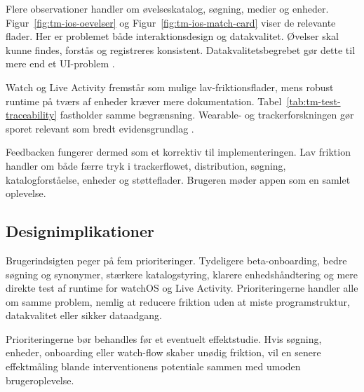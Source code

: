 Flere observationer handler om øvelseskatalog, søgning, medier og enheder. Figur~\ref{fig:tm-ios-oevelser} og Figur~\ref{fig:tm-ios-match-card} viser de relevante flader. Her er problemet både interaktionsdesign og datakvalitet. Øvelser skal kunne findes, forstås og registreres konsistent. Datakvalitetsbegrebet gør dette til mere end et UI-problem \cite{mohammed2025_five_facets_data_quality}.

Watch og Live Activity fremstår som mulige lav-friktionsflader, mens robust runtime på tværs af enheder kræver mere dokumentation. Tabel~\ref{tab:tm-test-traceability} fastholder samme begrænsning. Wearable- og trackerforskningen gør sporet relevant som bredt evidensgrundlag \cite{brickwood2019_wearable_trackers_meta,laranjo2021_apps_trackers_meta}.

Feedbacken fungerer dermed som et korrektiv til implementeringen. Lav friktion handler om både færre tryk i trackerflowet, distribution, søgning, katalogforståelse, enheder og støtteflader. Brugeren møder appen som en samlet oplevelse.

\subsection{Designimplikationer}

Brugerindsigten peger på fem prioriteringer. Tydeligere beta-onboarding, bedre søgning og synonymer, stærkere katalogstyring, klarere enhedshåndtering og mere direkte test af runtime for watchOS og Live Activity. Prioriteringerne handler alle om samme problem, nemlig at reducere friktion uden at miste programstruktur, datakvalitet eller sikker dataadgang.

Prioriteringerne bør behandles før et eventuelt effektstudie. Hvis søgning, enheder, onboarding eller watch-flow skaber unødig friktion, vil en senere effektmåling blande interventionens potentiale sammen med umoden brugeroplevelse.

